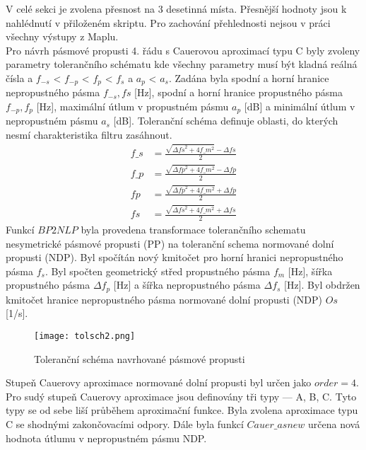V celé sekci je zvolena přesnost na 3 desetinná místa. Přesnější hodnoty jsou k nahlédnutí v přiloženém skriptu. Pro zachování přehlednosti nejsou v práci všechny výstupy z Maplu.\\
Pro návrh pásmové propusti 4. řádu s Cauerovou aproximací typu C byly zvoleny parametry tolerančního schématu 
\noindent kde všechny parametry musí být kladná reálná čísla a $f_{-s}$ <  $f_{-p}$ < $f_p$ < $f_s$ a $a_p$ < $a_s$. Zadána byla spodní a horní hranice nepropustného pásma $f_{-s},fs$ [Hz], spodní a horní hranice propustného pásma $f_{-p},f_p$ [Hz], maximální útlum v propustném pásmu $a_p$ [dB] a minimální útlum v nepropustném pásmu $a_s$ [dB]. Toleranční schéma definuje oblasti, do kterých nesmí charakteristika filtru zasáhnout.
\begin{align}
f\_s &= \frac{\sqrt{\Delta{fs}^2+4f\_m ^2}-\Delta{fs}}{2}\\
f\_p &= \frac{\sqrt{\Delta{fp}^2+4f\_m ^2}-\Delta{fp}}{2}\\
fp &= \frac{\sqrt{\Delta{fp}^2+4f\_m ^2}+\Delta{fp}}{2}\\
fs &= \frac{\sqrt{\Delta{fs}^2+4f\_m ^2}+\Delta{fs}}{2}
\end{align}
Funkcí $BP2NLP$ byla provedena transformace tolerančního schematu nesymetrické pásmové propusti (PP) na toleranční schema normované dolní propusti (NDP). Byl spočítán nový kmitočet pro horní hranici nepropustného pásma $f_s$. Byl spočten geometrický střed propustného pásma $f_m$ [Hz], šířka propustného pásma $\Delta{f_p}$ [Hz] a šířka nepropustného pásma $\Delta{f_s}$ [Hz].
\noindent Byl obdržen kmitočet hranice nepropustného pásma normované dolní propusti (NDP) $Os$ [1/s].
\begin{figure}[h]
\centering
\texttt{[image: tolsch2.png]}
\caption{Toleranční schéma navrhované pásmové propusti}
\end{figure}
\noindent Stupeň Cauerovy aproximace normované dolní propusti byl určen jako $order = 4$. Pro sudý stupeň Cauerovy aproximace jsou definovány tři typy --- A, B, C. Tyto typy se od sebe liší průběhem aproximační funkce. Byla zvolena aproximace typu C se shodnými zakončovacími odpory.
\noindent Dále byla funkcí $Cauer\_asnew$ určena nová hodnota útlumu v nepropustném pásmu NDP.
